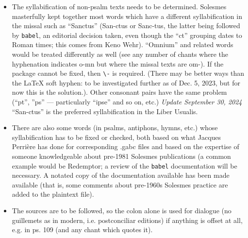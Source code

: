 \documentclass[11pt]{article}
\begin{document}
\begin{itemize}
\item
The syllabification of non-psalm texts needs to be determined. Solesmes masterfully kept together most words which have a different syllabification in the missal such as ``Sanctus'' (San-ctus or Sanc-tus, the latter being followed by \verb|babel|, an editorial decision taken, even though the ``ct'' grouping dates to Roman times; this comes from Keno Wehr). ``Omnium'' and related words would be treated differently as well (see any number of chants where the hyphenation indicates o-mn but where the missal texts are om-). If the package cannot be fixed, then \verb|\-| is required. (There may be better ways than the LaTeX soft hyphen: to be investigated further as of Dec. 5, 2023, but for now this is the solution.). Other consonant pairs have the same problem (``pt'', ''ps'' — particularly ``ipse'' and so on, etc.) \emph{Update September 30, 2024} ``San-ctus'' is the preferred syllabification in the Liber Usualis.

\item
There are also some words (in psalms, antiphons, hymns, etc.) whose syllabification has to be fixed or checked, both based on what Jacques Perrière has done for corresponding .gabc files and based on the expertise of someone knowledgeable about pre-1981 Solesmes publications (a common example would be Redemptor; a review of the \verb|babel| documentation will be necessary. A notated copy of the documentation available has been made available (that is, some comments about pre-1960s Solesmes practice are added to the plaintext file).

\item
The sources are to be followed, so the colon alone is used for dialogue (no guillemets as in modern, i.e. postconciliar editions) if anything is offset at all, e.g. in ps. 109 (and any chant which quotes it).

\end{itemize}
\end{document}
